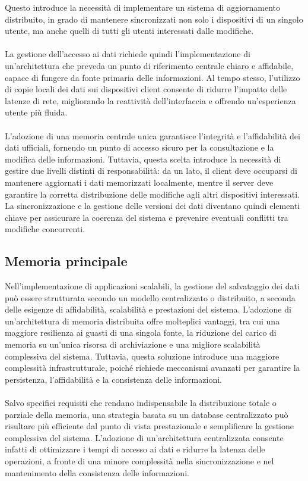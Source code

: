 Questo introduce la necessità di implementare un sistema di aggiornamento distribuito, in grado di mantenere sincronizzati non solo i dispositivi di un singolo utente, 
ma anche quelli di tutti gli utenti interessati dalle modifiche.\\
\\
La gestione dell’accesso ai dati richiede quindi l’implementazione di un’architettura che preveda un punto di riferimento centrale chiaro e affidabile, 
capace di fungere da fonte primaria delle informazioni. 
Al tempo stesso, l’utilizzo di copie locali dei dati sui dispositivi client consente di ridurre l’impatto delle latenze di rete, 
migliorando la reattività dell’interfaccia e offrendo un’esperienza utente più fluida.\\
\\
L’adozione di una memoria centrale unica garantisce l’integrità e l’affidabilità dei dati ufficiali, 
fornendo un punto di accesso sicuro per la consultazione e la modifica delle informazioni. 
Tuttavia, questa scelta introduce la necessità di gestire due livelli distinti di responsabilità: 
da un lato, il client deve occuparsi di mantenere aggiornati i dati memorizzati localmente, 
mentre il server deve garantire la corretta distribuzione delle modifiche agli altri dispositivi interessati. 
La sincronizzazione e la gestione delle versioni dei dati diventano quindi elementi chiave per assicurare la coerenza del sistema e prevenire eventuali conflitti tra modifiche concorrenti.

\clearpage
\subsection{Memoria principale}

	

Nell’implementazione di applicazioni scalabili, la gestione del salvataggio dei dati può essere strutturata secondo un modello centralizzato o distribuito, 
a seconda delle esigenze di affidabilità, scalabilità e prestazioni del sistema. 
L’adozione di un’architettura di memoria distribuita offre molteplici vantaggi, tra cui una maggiore resilienza ai guasti di una singola fonte, 
la riduzione del carico di memoria su un'unica risorsa di archiviazione e una migliore scalabilità complessiva del sistema. 
Tuttavia, questa soluzione introduce una maggiore complessità infrastrutturale, poiché richiede meccanismi avanzati per garantire la persistenza, 
l’affidabilità e la consistenza delle informazioni.\\
\\
Salvo specifici requisiti che rendano indispensabile la distribuzione totale o parziale della memoria, 
una strategia basata su un database centralizzato può risultare più efficiente dal punto di vista prestazionale e semplificare la gestione complessiva del sistema. 
L’adozione di un’architettura centralizzata consente infatti di ottimizzare i tempi di accesso ai dati e ridurre la latenza delle operazioni, 
a fronte di una minore complessità nella sincronizzazione e nel mantenimento della consistenza delle informazioni.\\
\\
